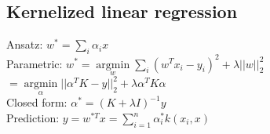 \subsection*{Kernelized linear regression}
Ansatz: $w^*=\sum_i \alpha_i x$\\
Parametric: $w^* = \underset{w}{\operatorname{argmin}} \sum_i (w^Tx_i-y_i)^2 + \lambda ||w||_2^2$\\
$= \underset{\alpha}{\operatorname{argmin}} ||\alpha^T K -y||_2^2 + \lambda \alpha^T K \alpha$\\
Closed form: $\alpha^* = (K+\lambda I)^{-1} y$\\
Prediction: $y = w^{*T} x = \sum \limits_{i=1}^n \alpha_i^* k(x_i,x)$
